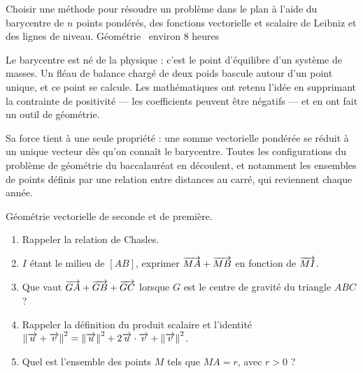   {Choisir une méthode pour résoudre un problème dans le plan à l'aide du
   barycentre de $n$ points pondérés, des fonctions vectorielle et scalaire de
   Leibniz et des lignes de niveau.}
  {Géométrie \textbullet\ environ 8 heures}

Le barycentre est né de la physique : c'est le point d'équilibre d'un système
de masses. Un fléau de balance chargé de deux poids bascule autour d'un point
unique, et ce point se calcule. Les mathématiques ont retenu l'idée en
supprimant la contrainte de positivité — les coefficients peuvent être
négatifs — et en ont fait un outil de géométrie.

Sa force tient à une seule propriété : une somme vectorielle pondérée se
réduit à un unique vecteur dès qu'on connaît le barycentre. Toutes les
configurations du problème de géométrie du baccalauréat en découlent, et
notamment les ensembles de points définis par une relation entre distances au
carré, qui reviennent chaque année.

\begin{revision}
Géométrie vectorielle de seconde et de première.

\begin{enumerate}[label=\textbf{\arabic*.}, leftmargin=*, itemsep=0.35em]
  \item Rappeler la relation de Chasles.
  \item $I$ étant le milieu de $[AB]$, exprimer $\overrightarrow{MA}+\overrightarrow{MB}$ en
        fonction de $\overrightarrow{MI}$.
  \item Que vaut $\overrightarrow{GA}+\overrightarrow{GB}+\overrightarrow{GC}$ lorsque $G$ est le centre de
        gravité du triangle $ABC$ ?
  \item Rappeler la définition du produit scalaire et l'identité
        $\left\lVert \overrightarrow{u}+\overrightarrow{v} \right\rVert^{2} = \left\lVert \overrightarrow{u} \right\rVert^{2}+2\overrightarrow{u} \cdot \overrightarrow{v}
        +\left\lVert \overrightarrow{v} \right\rVert^{2}$.
  \item Quel est l'ensemble des points $M$ tels que $MA = r$, avec $r>0$ ?
\end{enumerate}
\end{revision}

